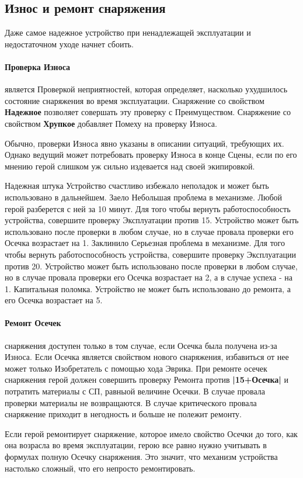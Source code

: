 \subsection{Износ и ремонт снаряжения}
Даже самое надежное устройство при ненадлежащей эксплуатации и недостаточном уходе начнет сбоить.
\paragraph{Проверка Износа} является Проверкой неприятностей, которая определяет, насколько ухудшилось состояние снаряжения во время эксплуатации.
\newline Снаряжение со свойством \textbf{Надежное} позволяет совершать эту проверку с Преимуществом.
\newline Снаряжение со свойством \textbf{Хрупкое} добавляет Помеху на проверку Износа.
\begin{tcolorbox}
Обычно, проверки Износа явно указаны в описании ситуаций, требующих их. Однако ведущий может потребовать проверку Износа в конце Сцены, если по его мнению герой слишком уж сильно издевается над своей экипировкой.
\end{tcolorbox}
\trouble
{Надежная штука}%
{Устройство счастливо избежало неполадок и может быть использовано в дальнейшем.}%
{Заело}%
{Небольшая проблема в механизме. Любой герой разберется с ней за 10 минут. Для того чтобы вернуть работоспособность устройства, совершите проверку Эксплуатации против 15. Устройство может быть использовано после проверки в любом случае, но в случае провала проверки его Осечка возрастает на 1.}%
{Заклинило}%
{Серьезная проблема в механизме. Для того чтобы вернуть работоспособность устройства, совершите проверку Эксплуатации против 20. Устройство может быть использовано после проверки в любом случае, но в случае провала проверки его Осечка возрастает на 2, а в случае успеха - на 1.}%
{Капитальная поломка.}%
{Устройство не может быть использовано до ремонта, а его Осечка возрастает на 5.}%
\paragraph{Ремонт Осечек} снаряжения доступен только в том случае, если Осечка была получена из-за Износа. Если Осечка является свойством нового снаряжения, избавиться от нее может только Изобретатель с помощью хода Эврика.
\newline
При ремонте осечек снаряжения герой должен совершить проверку Ремонта против \textbf{|15+Осечка|} и потратить материалы с СП, равныой величине Осечки. В случае провала проверки материалы не возвращаются. В случае критического провала снаряжение приходит в негодность и больше не полежит ремонту.
\begin{tcolorbox}
Если герой ремонтирует снаряжение, которое имело свойство Осечки до того, как она возрасла во время эксплуатации, герою все равно нужно учитывать в формулах полную Осечку снаряжения. Это значит, что механизм устройства настолько сложный, что его непросто ремонтировать.
\end{tcolorbox}
